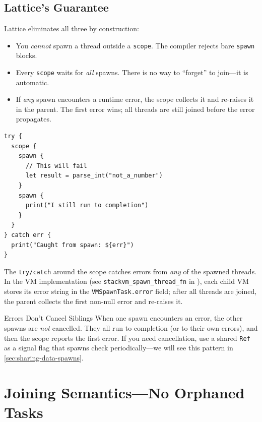 \subsection{Lattice's Guarantee}

Lattice eliminates all three by construction:

\begin{itemize}
  \item You \emph{cannot} spawn a thread outside a \lstinline|scope|. The compiler rejects bare \lstinline|spawn| blocks.
  \item Every \lstinline|scope| waits for \emph{all} spawns. There is no way to ``forget'' to join---it is automatic.
  \item If \emph{any} spawn encounters a runtime error, the scope collects it and re-raises it in the parent. The first error wins; all threads are still joined before the error propagates.
\end{itemize}

\begin{lstlisting}[language=Lattice, caption={Error propagation from spawns}]
try {
  scope {
    spawn {
      // This will fail
      let result = parse_int("not_a_number")
    }
    spawn {
      print("I still run to completion")
    }
  }
} catch err {
  print("Caught from spawn: ${err}")
}
\end{lstlisting}

The \lstinline|try/catch| around the scope catches errors from \emph{any} of the spawned threads.
In the VM implementation (see \texttt{stackvm\_spawn\_thread\_fn} in ), each child VM stores its error string in the \texttt{VMSpawnTask.error} field; after all threads are joined, the parent collects the first non-null error and re-raises it.

\begin{warnbox}{Errors Don't Cancel Siblings}
When one spawn encounters an error, the other spawns are \emph{not} cancelled.
They all run to completion (or to their own errors), and then the scope reports the first error.
If you need cancellation, use a shared \lstinline|Ref| as a signal flag that spawns check periodically---we will see this pattern in \cref{sec:sharing-data-spawns}.
\end{warnbox}

\section{Joining Semantics---No Orphaned Tasks}\label{sec:joining-semantics}

